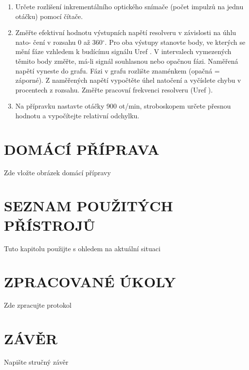 \documentclass{protokol}
\begin{document}
\begin{enumerate}
        \item   Určete rozlišení inkrementálního optického snímače (počet impulzů na jednu otáčku)
                pomocí čítače.
                
        \item   Změřte efektivní hodnotu výstupních napětí resolveru v závislosti na úhlu nato-
                čení v rozsahu 0 až 360$^\circ$. Pro oba výstupy stanovte body, ve kterých se mění fáze
                vzhledem k budícímu signálu Uref . V intervalech vymezených těmito body změřte,
                má-li signál souhlasnou nebo opačnou fázi. Naměřená napětí vyneste do grafu. Fázi
                v grafu rozlište znaménkem (opačná = záporné). Z naměřených napětí vypočtěte
                úhel natočení a vyčíslete chybu v procentech z rozsahu. Změřte pracovní frekvenci
                resolveru (Uref ).

        \item   Na přípravku nastavte otáčky 900 ot/min, stroboskopem určete přesnou hodnotu a
                vypočítejte relativní odchylku.
    \end{enumerate}

\section{DOMÁCÍ PŘÍPRAVA}
Zde vložte obrázek domácí přípravy

\section{SEZNAM POUŽITÝCH PŘÍSTROJŮ}
Tuto kapitolu použijte s ohledem na aktuální situaci

\section{ZPRACOVANÉ ÚKOLY}
Zde zpracujte protokol

\section{ZÁVĚR}
Napište stručný závěr
\end{document}
